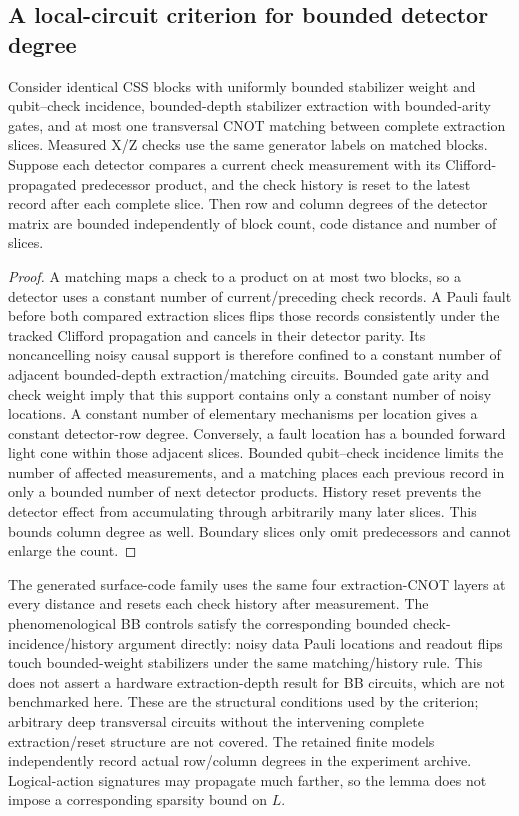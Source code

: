\subsection{A local-circuit criterion for bounded detector degree}
\begin{lemma}
Consider identical CSS blocks with uniformly bounded stabilizer weight and qubit--check incidence, bounded-depth stabilizer extraction with bounded-arity gates, and at most one transversal CNOT matching between complete extraction slices. Measured X/Z checks use the same generator labels on matched blocks. Suppose each detector compares a current check measurement with its Clifford-propagated predecessor product, and the check history is reset to the latest record after each complete slice. Then row and column degrees of the detector matrix are bounded independently of block count, code distance and number of slices.
\end{lemma}
\begin{proof}
A matching maps a check to a product on at most two blocks, so a detector uses a constant number of current/preceding check records. A Pauli fault before both compared extraction slices flips those records consistently under the tracked Clifford propagation and cancels in their detector parity. Its noncancelling noisy causal support is therefore confined to a constant number of adjacent bounded-depth extraction/matching circuits. Bounded gate arity and check weight imply that this support contains only a constant number of noisy locations. A constant number of elementary mechanisms per location gives a constant detector-row degree.
Conversely, a fault location has a bounded forward light cone within those adjacent slices. Bounded qubit--check incidence limits the number of affected measurements, and a matching places each previous record in only a bounded number of next detector products. History reset prevents the detector effect from accumulating through arbitrarily many later slices. This bounds column degree as well. Boundary slices only omit predecessors and cannot enlarge the count.
\end{proof}
The generated surface-code family uses the same four extraction-CNOT layers at every distance and resets each check history after measurement. The phenomenological BB controls satisfy the corresponding bounded check-incidence/history argument directly: noisy data Pauli locations and readout flips touch bounded-weight stabilizers under the same matching/history rule. This does not assert a hardware extraction-depth result for BB circuits, which are not benchmarked here. These are the structural conditions used by the criterion; arbitrary deep transversal circuits without the intervening complete extraction/reset structure are not covered. The retained finite models independently record actual row/column degrees in the experiment archive. Logical-action signatures may propagate much farther, so the lemma does not impose a corresponding sparsity bound on $L$.

